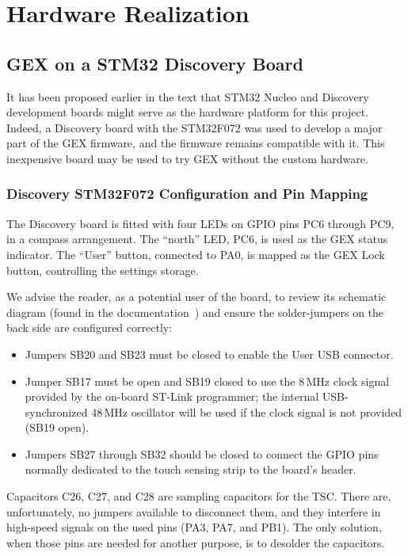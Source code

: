 \chapter{Hardware Realization} \label{sec:hwreal}

\section{GEX on a STM32 Discovery Board}

It has been proposed earlier in the text that STM32 Nucleo and Discovery development boards might serve as the hardware platform for this project. Indeed, a Discovery board with the STM32F072 was used to develop a major part of the GEX firmware, and the firmware remains compatible with it. This inexpensive board may be used to try GEX without the custom hardware.

\subsection{Discovery STM32F072 Configuration and Pin Mapping}

The Discovery board is fitted with four \glspl{LED} on \gls{GPIO} pins PC6 through PC9, in a compass arrangement. The ``north'' \gls{LED}, PC6, is used as the GEX status indicator. The ``User'' button, connected to PA0, is mapped as the GEX Lock button, controlling the settings storage.

We advise the reader, as a potential user of the board, to review its schematic diagram (found in the documentation~\cite{disco-f072}) and ensure the solder-jumpers on the back side are configured correctly:

\begin{itemize}
	\item Jumpers SB20 and SB23 must be closed to enable the User \gls{USB} connector.
	
	\item Jumper SB17 must be open and SB19 closed to use the 8\,MHz clock signal provided by the on-board ST-Link programmer; the internal USB-synchronized 48\,MHz oscillator will be used if the clock signal is not provided (SB19 open).
	
	\item Jumpers SB27 through SB32 should be closed to connect the \gls{GPIO} pins normally dedicated to the touch sensing strip to the board's header.
\end{itemize} 

Capacitors C26, C27, and C28 are sampling capacitors for the \gls{TSC}. There are, unfortunately, no jumpers available to disconnect them, and they interfere in high-speed signals on the used pins (PA3, PA7, and PB1). The only solution, when those pins are needed for another purpose, is to desolder the capacitors.

